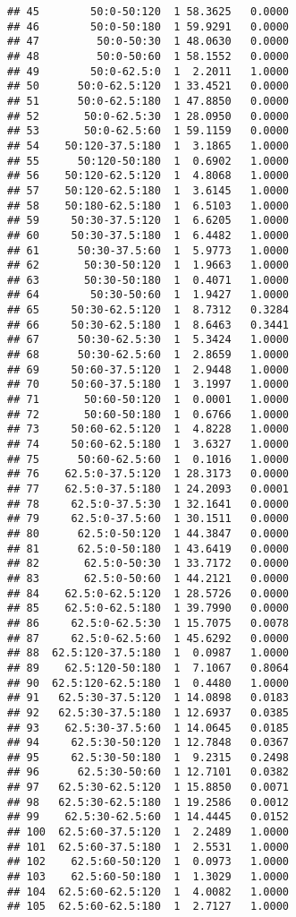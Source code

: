 \begin{knitrout}
\begin{kframe}
\begin{verbatim}
## 45        50:0-50:120  1 58.3625   0.0000
## 46        50:0-50:180  1 59.9291   0.0000
## 47         50:0-50:30  1 48.0630   0.0000
## 48         50:0-50:60  1 58.1552   0.0000
## 49        50:0-62.5:0  1  2.2011   1.0000
## 50      50:0-62.5:120  1 33.4521   0.0000
## 51      50:0-62.5:180  1 47.8850   0.0000
## 52       50:0-62.5:30  1 28.0950   0.0000
## 53       50:0-62.5:60  1 59.1159   0.0000
## 54    50:120-37.5:180  1  3.1865   1.0000
## 55      50:120-50:180  1  0.6902   1.0000
## 56    50:120-62.5:120  1  4.8068   1.0000
## 57    50:120-62.5:180  1  3.6145   1.0000
## 58    50:180-62.5:180  1  6.5103   1.0000
## 59     50:30-37.5:120  1  6.6205   1.0000
## 60     50:30-37.5:180  1  6.4482   1.0000
## 61      50:30-37.5:60  1  5.9773   1.0000
## 62       50:30-50:120  1  1.9663   1.0000
## 63       50:30-50:180  1  0.4071   1.0000
## 64        50:30-50:60  1  1.9427   1.0000
## 65     50:30-62.5:120  1  8.7312   0.3284
## 66     50:30-62.5:180  1  8.6463   0.3441
## 67      50:30-62.5:30  1  5.3424   1.0000
## 68      50:30-62.5:60  1  2.8659   1.0000
## 69     50:60-37.5:120  1  2.9448   1.0000
## 70     50:60-37.5:180  1  3.1997   1.0000
## 71       50:60-50:120  1  0.0001   1.0000
## 72       50:60-50:180  1  0.6766   1.0000
## 73     50:60-62.5:120  1  4.8228   1.0000
## 74     50:60-62.5:180  1  3.6327   1.0000
## 75      50:60-62.5:60  1  0.1016   1.0000
## 76    62.5:0-37.5:120  1 28.3173   0.0000
## 77    62.5:0-37.5:180  1 24.2093   0.0001
## 78     62.5:0-37.5:30  1 32.1641   0.0000
## 79     62.5:0-37.5:60  1 30.1511   0.0000
## 80      62.5:0-50:120  1 44.3847   0.0000
## 81      62.5:0-50:180  1 43.6419   0.0000
## 82       62.5:0-50:30  1 33.7172   0.0000
## 83       62.5:0-50:60  1 44.2121   0.0000
## 84    62.5:0-62.5:120  1 28.5726   0.0000
## 85    62.5:0-62.5:180  1 39.7990   0.0000
## 86     62.5:0-62.5:30  1 15.7075   0.0078
## 87     62.5:0-62.5:60  1 45.6292   0.0000
## 88  62.5:120-37.5:180  1  0.0987   1.0000
## 89    62.5:120-50:180  1  7.1067   0.8064
## 90  62.5:120-62.5:180  1  0.4480   1.0000
## 91   62.5:30-37.5:120  1 14.0898   0.0183
## 92   62.5:30-37.5:180  1 12.6937   0.0385
## 93    62.5:30-37.5:60  1 14.0645   0.0185
## 94     62.5:30-50:120  1 12.7848   0.0367
## 95     62.5:30-50:180  1  9.2315   0.2498
## 96      62.5:30-50:60  1 12.7101   0.0382
## 97   62.5:30-62.5:120  1 15.8850   0.0071
## 98   62.5:30-62.5:180  1 19.2586   0.0012
## 99    62.5:30-62.5:60  1 14.4445   0.0152
## 100  62.5:60-37.5:120  1  2.2489   1.0000
## 101  62.5:60-37.5:180  1  2.5531   1.0000
## 102    62.5:60-50:120  1  0.0973   1.0000
## 103    62.5:60-50:180  1  1.3029   1.0000
## 104  62.5:60-62.5:120  1  4.0082   1.0000
## 105  62.5:60-62.5:180  1  2.7127   1.0000
\end{verbatim}
\end{kframe}
\end{knitrout}

